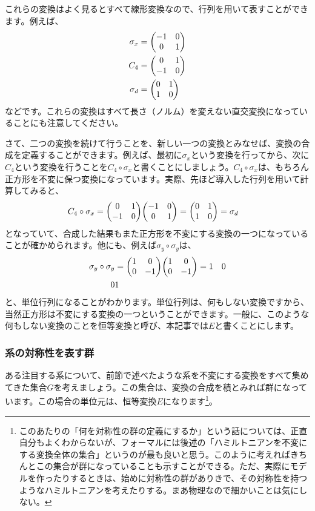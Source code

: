 \documentclass[uplatex,dvipdfmx]{jsarticle}
\begin{document}
これらの変換はよく見るとすべて線形変換なので、行列を用いて表すことができます。例えば、
\begin{align}
	\sigma_x &= \mqty(-1 & 0 \\
					   0 & 1 ) \\
	C_4 &= \mqty(0 & 1 \\
				 -1& 0 )\\
	\sigma_d &= \mqty(0 & 1 \\
					1 & 0)
\end{align}
などです。これらの変換はすべて長さ（ノルム）を変えない直交変換になっていることにも注意してください。

さて、二つの変換を続けて行うことを、新しい一つの変換とみなせば、変換の合成を定義することができます。例えば、最初に$\sigma_x$という変換を行ってから、次に$C_4$という変換を行うことを$C_4 \circ \sigma_x$と書くことにしましょう。$C_4\circ \sigma_x$は、もちろん正方形を不変に保つ変換になっています。実際、先ほど導入した行列を用いて計算してみると、
\begin{align}
	C_4\circ \sigma_x &= 
	\mqty(	0	& 1 \\
		  	-1	& 0 )
	\mqty(	-1	& 0 \\
			0	& 1 ) = 
	\mqty(	0	& 1 \\
			1	& 0 ) = \sigma_d
\end{align}
となっていて、合成した結果もまた正方形を不変にする変換の一つになっていることが確かめられます。他にも、例えば$\sigma_y\circ\sigma_y$は、
\begin{align}
	\sigma_y\circ\sigma_y &= 
	\mqty(	1	& 0 \\
			0	& -1 ) 
	\mqty(	1	& 0 \\
			0	& -1 ) = \imat{2} 		 
\end{align}
と、単位行列になることがわかります。単位行列は、何もしない変換ですから、当然正方形は不変にする変換の一つということができます。一般に、このような何もしない変換のことを恒等変換と呼び、本記事では$E$と書くことにします。

\subsubsection{系の対称性を表す群}
ある注目する系について、前節で述べたような系を不変にする変換をすべて集めてきた集合$G$を考えましょう。この集合は、変換の合成を積とみれば群になっています。この場合の単位元は、恒等変換$E$になります\footnote{このあたりの「何を対称性の群の定義にするか」という話については、正直自分もよくわからないが、フォーマルには後述の「ハミルトニアンを不変にする変換全体の集合」というのが最も良いと思う。このように考えればきちんとこの集合が群になっていることも示すことができる。ただ、実際にモデルを作ったりするときは、始めに対称性の群がありきで、その対称性を持つようなハミルトニアンを考えたりする。まあ物理なので細かいことは気にしない。}。
\end{document}
